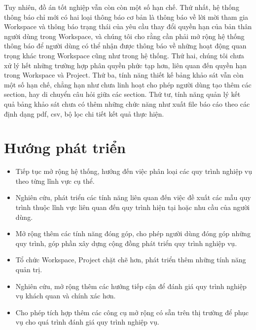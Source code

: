 \par
Tuy nhiên, đồ án tốt nghiệp vẫn còn còn một số hạn chế. Thứ nhất, hệ thống thông báo chỉ mới có hai loại thông báo cơ bản 
là thông báo về lời mời tham gia Workspace và thông báo trạng thái của yêu cầu thay đổi quyền hạn của bản thân người dùng 
trong Workspace, và chúng tôi cho rằng cần phải mở rộng hệ thống thông báo để người dùng có thể nhận được thông báo về những 
hoạt động quan trọng khác trong Workspace cũng như trong hệ thống. Thứ hai, chúng tôi chưa xử lý hết những trường hợp 
phân quyền phức tạp hơn, liên quan đến quyền hạn trong Workspace và Project. Thứ ba, tính năng thiết kế bảng khảo sát 
vẫn còn một số hạn chế, chẳng hạn như chưa linh hoạt cho phép người dùng tạo thêm các section, hay di chuyển câu hỏi 
giữa các section. Thứ tư, tính năng quản lý kết quả bảng khảo sát chưa có thêm những chức năng như xuất file báo cáo 
theo các định dạng pdf, csv, bộ lọc chi tiết kết quả thực hiện.

\section{Hướng phát triển}
\begin{itemize}
    \item Tiếp tục mở rộng hệ thống, hướng đến việc phân loại các quy trình nghiệp vụ theo từng lĩnh vực cụ thể.
    \item Nghiên cứu, phát triển các tính năng liên quan đến việc đề xuất các mẫu quy trình thuộc lĩnh vực liên quan đến quy trình hiện tại hoặc nhu cầu của người dùng.
    \item Mở rộng thêm các tính năng đóng góp, cho phép người dùng đóng góp những quy trình, góp phần xây dựng cộng đồng phát triển quy trình nghiệp vụ.
    \item Tổ chức Workspace, Project chặt chẽ hơn, phát triển thêm những tính năng quản trị.
    \item Nghiên cứu, mở rộng thêm các hướng tiếp cận để đánh giá quy trình nghiệp vụ khách quan và chính xác hơn.
    \item Cho phép tích hợp thêm các công cụ mở rộng có sẵn trên thị trường để phục vụ cho quá trình đánh giá quy trình nghiệp vụ.
\end{itemize}